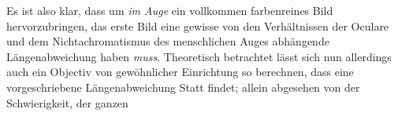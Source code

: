 Es ist also klar, dass um \textit{im Auge} ein vollkommen farbenreines Bild hervorzubringen, das erste Bild eine gewisse von den Verhältnissen der Oculare und dem Nichtachromatismus des menschlichen Auges abhängende Längenabweichung haben \textit{muss}. Theoretisch betrachtet lässt sich nun allerdings auch ein Objectiv von gewöhnlicher Einrichtung so berechnen, dass eine vorgeschriebene Längenabweichung Statt findet; allein abgesehen von der Schwierigkeit, der ganzen
